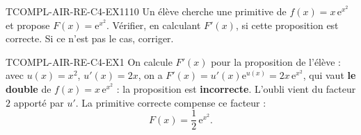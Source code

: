 

\begin{exercice}{TCOMPL-AIR-RE-C4-EX1}{1}{10}
Un élève cherche une primitive de $f(x) = x\,\mathrm{e}^{x^2}$ et propose $F(x) = \mathrm{e}^{x^2}$. Vérifier, en calculant $F'(x)$, si cette proposition est correcte. Si ce n'est pas le cas, corriger.
\end{exercice}


\begin{corrige}{TCOMPL-AIR-RE-C4-EX1}
On calcule $F'(x)$ pour la proposition de l'élève : avec $u(x)=x^2$, $u'(x)=2x$, on a $F'(x) = u'(x)\mathrm{e}^{u(x)} = 2x\,\mathrm{e}^{x^2}$, qui vaut \textbf{le double} de $f(x)=x\,\mathrm{e}^{x^2}$ : la proposition est \textbf{incorrecte}. L'oubli vient du facteur $2$ apporté par $u'$. La primitive correcte compense ce facteur :
\[
  F(x) = \frac{1}{2}\,\mathrm{e}^{x^2}.
\]
\end{corrige}
